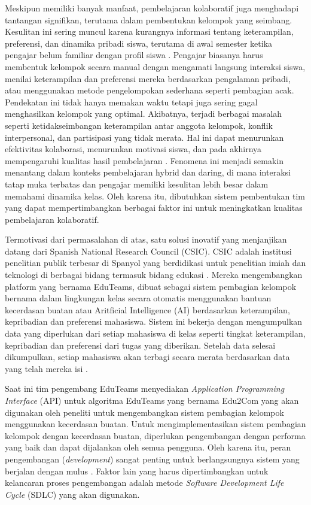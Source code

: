 Meskipun memiliki banyak manfaat, pembelajaran kolaboratif juga menghadapi
tantangan signifikan, terutama dalam pembentukan kelompok yang seimbang.
Kesulitan ini sering muncul karena kurangnya informasi tentang keterampilan,
preferensi, dan dinamika pribadi siswa, terutama di awal semester ketika
pengajar belum familiar dengan profil siswa \cite{Mburasek2021}. Pengajar
biasanya harus membentuk kelompok secara manual dengan mengamati langsung
interaksi siswa, menilai keterampilan dan preferensi mereka berdasarkan
pengalaman pribadi, atau menggunakan metode pengelompokan sederhana seperti
pembagian acak. Pendekatan ini tidak hanya memakan waktu tetapi juga sering
gagal menghasilkan kelompok yang optimal. Akibatnya, terjadi berbagai masalah
seperti ketidakseimbangan keterampilan antar anggota kelompok, konflik
interpersonal, dan partisipasi yang tidak merata. Hal ini dapat menurunkan
efektivitas kolaborasi, menurunkan motivasi siswa, dan pada akhirnya
mempengaruhi kualitas hasil pembelajaran \cite{Vinella2022}. Fenomena ini
menjadi semakin menantang dalam konteks pembelajaran hybrid dan daring, di mana
interaksi tatap muka terbatas dan pengajar memiliki kesulitan lebih besar dalam
memahami dinamika kelas. Oleh karena itu, dibutuhkan sistem pembentukan tim
yang dapat mempertimbangkan berbagai faktor ini untuk meningkatkan kualitas
pembelajaran kolaboratif.

Termotivasi dari permasalahan di atas, satu solusi inovatif yang menjanjikan
datang dari Spanish National Research Council (CSIC). CSIC adalah institusi
penelitian publik terbesar di Spanyol yang berdidikasi untuk penelitian imiah
dan teknologi di berbagai bidang termasuk bidang edukasi \cite{Bernal2011}.
Mereka mengembangkan platform yang bernama EduTeams, dibuat sebagai sistem
pembagian kelompok bernama dalam lingkungan kelas secara otomatis menggunakan
bantuan kecerdasan buatan atau Aritficial Intelligence (AI) berdasarkan
keterampilan, kepribadian dan preferensi mahasiswa. Sistem ini bekerja dengan
mengumpulkan data yang diperlukan dari setiap mahasiswa di kelas seperti
tingkat keterampilan, kepribadian dan preferensi dari tugas yang diberikan.
Setelah data selesai dikumpulkan, setiap mahasiswa akan terbagi secara merata
berdasarkan data yang telah mereka isi \cite{Georgara2023}.

Saat ini tim pengembang EduTeams menyediakan \textit{Application Programming
	Interface} (API) \cite{Nawaz2022} untuk algoritma EduTeams yang bernama Edu2Com
yang akan digunakan oleh peneliti untuk mengembangkan sistem pembagian kelompok
menggunakan kecerdasan buatan. Untuk mengimplementasikan sistem pembagian
kelompok dengan kecerdasan buatan, diperlukan pengembangan dengan performa yang
baik dan dapat dijalankan oleh semua pengguna. Oleh karena itu, peran
pengembangan (\textit{development}) sangat penting untuk berlangsungnya sistem
yang berjalan dengan mulus \cite{Govea2023}. Faktor lain yang harus
dipertimbangkan untuk kelancaran proses pengembangan adalah metode
\textit{Software Development Life Cycle} (SDLC) yang akan digunakan.


